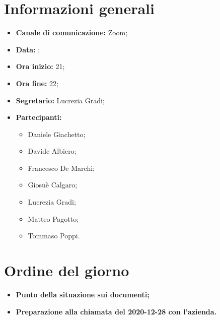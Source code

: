 \section{Informazioni generali}

\begin{itemize}

	\item \textbf{Canale di comunicazione:} Zoom;
	
	\item \textbf{Data:} \DataMeeting{};
	
	\item \textbf{Ora inizio:} 21;
	
	\item \textbf{Ora fine:} 22;
	
	\item \textbf{Segretario:} Lucrezia Gradi;
	
	\item \textbf{Partecipanti:}
	
		\begin{itemize}
		
			\item Daniele Giachetto;
			\item Davide Albiero;
			\item Francesco De Marchi;
			\item Giosuè Calgaro;
			\item Lucrezia Gradi;
			\item Matteo Pagotto;
			\item Tommaso Poppi.
				 
		\end{itemize}

\end{itemize}

\section{Ordine del giorno}

\begin{itemize}

	\item\textbf{Punto della situazione sui documenti;}
	
	\item\textbf{Preparazione alla chiamata del 2020-12-28 con l'azienda.}

\end{itemize}

\newpage


